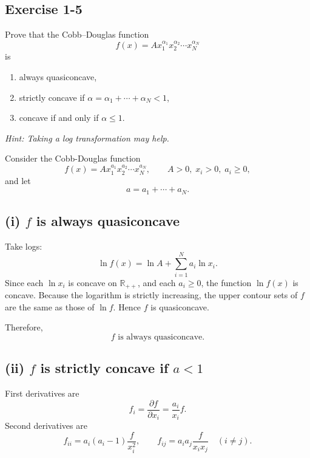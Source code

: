 \vspace{30pt}
\begin{tcolorbox}[breakable]

\subsection*{Exercise 1-5}

Prove that the Cobb--Douglas function
\[
f(x) = A x_1^{\alpha_1} x_2^{\alpha_2} \cdots x_N^{\alpha_N}
\]
is

\begin{enumerate}
    \item[(i)] always quasiconcave,
    \item[(ii)] strictly concave if $\alpha = \alpha_1+\cdots+\alpha_N < 1$,
    \item[(iii)] concave if and only if $\alpha \le 1$.
\end{enumerate}

\textit{Hint: Taking a log transformation may help.}

\end{tcolorbox}




Consider the Cobb-Douglas function
\[
f(x)=A x_1^{a_1}x_2^{a_2}\cdots x_N^{a_N},
\qquad A>0,\; x_i>0,\; a_i\ge 0,
\]
and let
\[
a=a_1+\cdots+a_N.
\]

\subsection*{(i) \(f\) is always quasiconcave}

Take logs:
\[
\ln f(x)=\ln A+\sum_{i=1}^N a_i \ln x_i.
\]
Since each \(\ln x_i\) is concave on \(\mathbb{R}_{++}\), and each \(a_i\ge 0\), the function \(\ln f(x)\) is concave. Because the logarithm is strictly increasing, the upper contour sets of \(f\) are the same as those of \(\ln f\). Hence \(f\) is quasiconcave.

Therefore,
\[
\boxed{f \text{ is always quasiconcave.}}
\]

\subsection*{(ii) \(f\) is strictly concave if \(a<1\)}

First derivatives are
\[
f_i=\frac{\partial f}{\partial x_i}=\frac{a_i}{x_i}f.
\]
Second derivatives are
\[
f_{ii}=a_i(a_i-1)\frac{f}{x_i^2},
\qquad
f_{ij}=a_i a_j \frac{f}{x_i x_j}\quad (i\ne j).
\]


